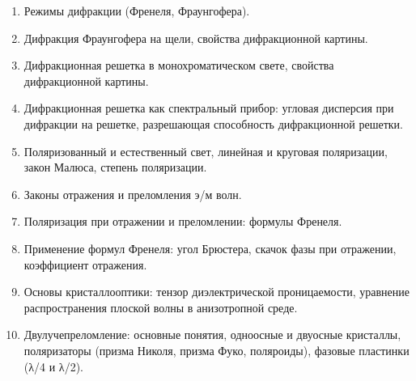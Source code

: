 \documentclass[12pt]{article}
\begin{document}
\begin{enumerate}
    \item Режимы дифракции (Френеля, Фраунгофера).

    \item Дифракция Фраунгофера на щели, свойства дифракционной картины.

    \item Дифракционная решетка в монохроматическом свете, свойства дифракционной картины.

    \item Дифракционная решетка как спектральный прибор: угловая дисперсия при дифракции на решетке, разрешающая способность дифракционной решетки.

    \item Поляризованный и естественный свет, линейная и круговая поляризации, закон Малюса, степень поляризации.

    \item Законы отражения и преломления э/м волн.

    \item Поляризация при отражении и преломлении: формулы Френеля.

    \item Применение формул Френеля: угол Брюстера, скачок фазы при отражении, коэффициент отражения.

    \item Основы кристаллооптики: тензор диэлектрической проницаемости, уравнение распространения плоской волны в анизотропной среде.

    \item Двулучепреломление: основные понятия, одноосные и двуосные кристаллы, поляризаторы (призма Николя, призма Фуко, поляроиды), фазовые пластинки (λ/4 и λ/2).
\end{enumerate}

\end{document}
